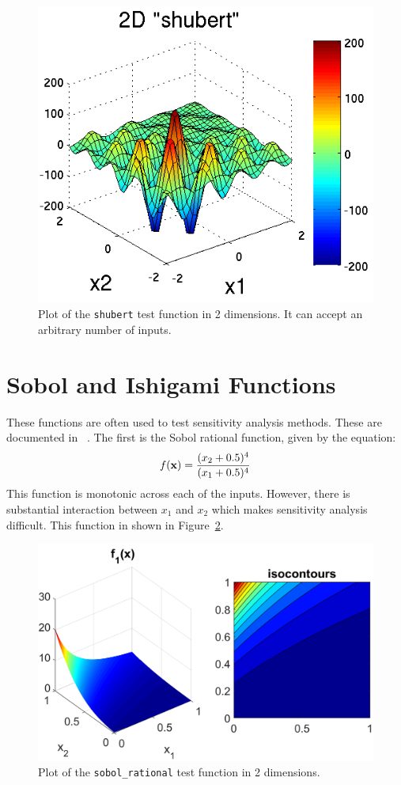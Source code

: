 \begin{figure}
  \centering
  \centerline{\includegraphics[scale=1.0]{images/DAK5pt2_2D_shubert}}
  \caption{Plot of the \texttt{shubert} test function in 2 dimensions.
           It can accept an arbitrary number of inputs.}
  \label{fig:2D_shubert}
\end{figure}

\section{Sobol and Ishigami Functions}
These functions are often used to test sensitivity analysis methods. 
These are documented in ~\cite{storlie_09}.  The first is 
the Sobol rational function, given by the equation: 
\begin{equation}
f({\bf x})=\frac{(x_2+0.5)^4}{(x_1+0.5)^4}
\end{equation}
This function is monotonic across each of the inputs.  However, there is 
substantial interaction between $x_1$ and $x_2$ which makes sensitivity analysis 
difficult.
This function in shown in Figure~\ref{fig:sobol_rational}.
\begin{figure}
  \centering
  \includegraphics[scale=0.7]{images/sobol_rational}
  \caption{Plot of the \texttt{sobol\_rational} test function in 2 dimensions.}
  \label{fig:sobol_rational}
\end{figure}

